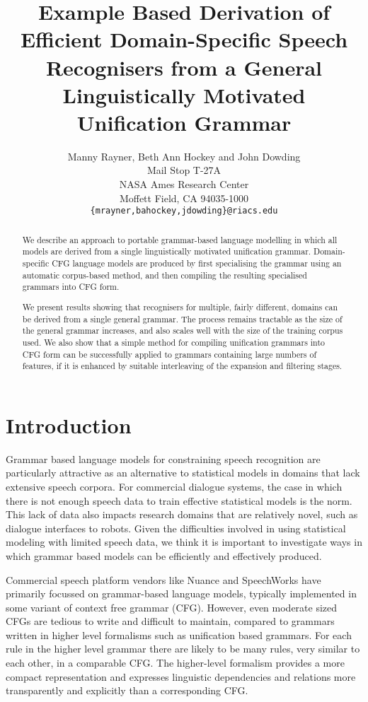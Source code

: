\documentclass[11pt]{article}
\title{Example Based Derivation of Efficient Domain-Specific Speech Recognisers from a General Linguistically Motivated Unification Grammar}
\author{Manny Rayner, Beth Ann Hockey and John Dowding\\
  Mail Stop T-27A \\
  NASA Ames Research Center \\
  Moffett Field, CA 94035-1000 \\
  {\tt \{mrayner,bahockey,jdowding\}@riacs.edu} }
\date{}
\begin{document}
\maketitle

\begin{abstract}

We describe an approach to portable grammar-based language modelling
in which all models are derived from a single linguistically motivated
unification grammar. Domain-specific CFG language models are produced
by first specialising the grammar using an automatic corpus-based
method, and then compiling the resulting specialised grammars into CFG
form.

We present results showing that recognisers for multiple, fairly
different, domains can be derived from a single general grammar. The
process remains tractable as the size of the general grammar
increases, and also scales well with the size of the training corpus
used. We also show that a simple method for compiling unification
grammars into CFG form can be successfully applied to grammars
containing large numbers of features, if it is enhanced by suitable
interleaving of the expansion and filtering stages.

\end{abstract}

\section{Introduction}

Grammar based language models for constraining speech recognition are
particularly attractive as an alternative to statistical models in
domains that lack extensive speech corpora. For commercial dialogue
systems, the case in which there is not enough speech data to train
effective statistical models is the norm. This lack of data
also impacts research domains that are relatively novel, such as
dialogue interfaces to robots. Given the difficulties involved in
using statistical modeling with limited speech data, we think it is
important to investigate ways in which grammar based models can be
efficiently and effectively produced.

Commercial speech platform vendors like 
Nuance \cite{Nuance} and SpeechWorks \cite{SpeechWorks} have primarily focussed on grammar-based
language models, typically implemented in some variant
of context free grammar (CFG). However, even moderate sized
CFGs are tedious to write and difficult to maintain, compared to
grammars written in higher level formalisms such as unification based
grammars. For each rule in the higher level grammar there are likely
to be many rules, very similar to each other, in a comparable CFG. The
higher-level formalism provides a more compact representation and
expresses linguistic dependencies and relations more transparently and
explicitly than a corresponding CFG.
\end{document}
